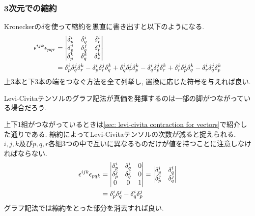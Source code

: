 \documentclass[dvipdfmx]{jsarticle}
\begin{document}
\subsubsection{3次元での縮約}

Kroneckerの$\delta$を使って縮約を愚直に書き出すと以下のようになる.
\begin{align*}
    \epsilon^{ijk}\epsilon_{pqr}
    &=
    \mqty|
        \delta^i_p & \delta^i_q & \delta^i_r
        \\
        \delta^j_p & \delta^j_q & \delta^j_r
        \\
        \delta^k_p & \delta^k_q & \delta^k_r
    |
    \\
    &=
    \delta^i_p\delta^j_q\delta^k_r
    -
    \delta^i_p\delta^j_r\delta^k_q
    +
    \delta^i_q\delta^j_r\delta^k_p
    -
    \delta^i_q\delta^j_p\delta^k_r
    +
    \delta^i_r\delta^j_p\delta^k_q
    -
    \delta^i_r\delta^j_q\delta^k_p
\end{align*}
\begin{equation*}
    
\end{equation*}
上3本と下3本の端をつなぐ方法を全て列挙し, 置換に応じた符号を与えれば良い.

Levi-Civitaテンソルのグラフ記法が真価を発揮するのは一部の脚がつながっている場合だろう.

上下1組がつながっているときは\ref{sec: levi-civita contraction for vectors}で紹介した通りである.
縮約によってLevi-Civitaテンソルの次数が減ると捉えられる.
$i,j,k$及び$p,q,r$各組3つの中で互いに異なるものだけが値を持つことに注意しなければならない.
\begin{align*}
    \epsilon^{ijk}\epsilon_{pqk}
    &=
    \mqty|
        \delta^i_p & \delta^i_q & 0
        \\
        \delta^j_p & \delta^j_q & 0
        \\
        0 & 0 & 1
    |
    =
    \mqty|
        \delta^i_p & \delta^i_q
        \\
        \delta^j_p & \delta^j_q
    |
    \\
    &=\delta^i_p\delta^j_q-\delta^i_q\delta^j_p
\end{align*}
グラフ記法では縮約をとった部分を消去すれば良い.
\begin{equation*}
    
\end{equation*}
\end{document}
